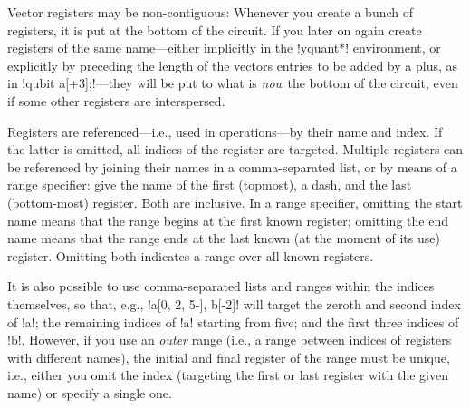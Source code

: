 \documentclass{scrartcl}
\begin{document}
         Vector registers may be non\hyp contiguous: Whenever you create a bunch of registers, it is put at the bottom of the circuit.
         If you later on again create registers of the same name---either implicitly in the \tex!yquant*! environment, or explicitly by preceding the length of the vectors entries to be added by a plus, as in \yquant!qubit a[+3];!---they will be put to what is \emph{now} the bottom of the circuit, even if some other registers are interspersed.

         Registers are referenced---i.e., used in operations---by their name and index.
         If the latter is omitted, all indices of the register are targeted.
         Multiple registers can be referenced by joining their names in a comma\hyp separated list, or by means of a range specifier: give the name of the first (topmost), a dash, and the last (bottom\hyp most) register.
         Both are inclusive.
         In a range specifier, omitting the start name means that the range begins at the first known register; omitting the end name means that the range ends at the last known (at the moment of its use) register.
         Omitting both indicates a range over all known registers.

         It is also possible to use comma\hyp separated lists and ranges within the indices themselves, so that, e.g., \yquant!a[0, 2, 5-], b[-2]! will target the zeroth and second index of \yquant!a!; the remaining indices of \yquant!a! starting from five; and the first three indices of \yquant!b!.
         However, if you use an \emph{outer} range (i.e., a range between indices of registers with different names), the initial and final register of the range must be unique, i.e., either you omit the index (targeting the first or last register with the given name) or specify a single one.
\end{document}
